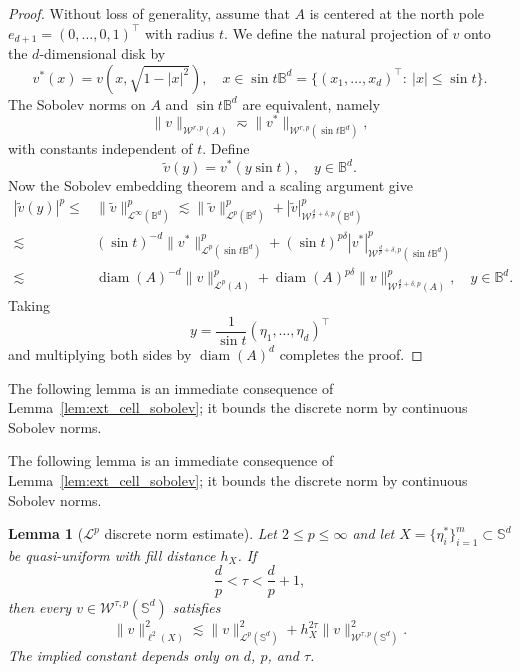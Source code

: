 \documentclass{article}
\numberwithin{equation}{section}
\newtheorem{lemma}{Lemma}
\def\BB{\mathbb{B}}
\def\SS{\mathbb{S}}
\begin{document}
\begin{proof}
    Without loss of generality, assume that $A$ is centered at the north pole $e_{d+1}=(0,\dots,0,1)^\top$ with radius $t$. We define the natural projection of $v$ onto the $d$-dimensional disk by
    \begin{equation*}
        v^*(x)=v(x,\sqrt{1-|x|^2}),\quad x\in\sin t\BB^d=\{(x_1,\dots,x_d)^\top:~|x|\leq\sin t\}.
    \end{equation*}
    The Sobolev norms on $A$ and $\sin t\BB^d$ are equivalent, namely
    \begin{equation}\label{eqn_equiv_cap_ball}
        \|v\|_{\mathcal{W}^{r,p}(A)}\eqsim\|v^*\|_{\mathcal{W}^{r,p}(\sin t\BB^d)},
    \end{equation}
    with constants independent of $t$. Define
    $$\tilde{v}(y)=v^*(y\sin t),\quad y\in\BB^d.$$
    Now the Sobolev embedding theorem and a scaling argument give
    \begin{equation*}
        \begin{split}
            |\tilde v(y)|^p
            \leq&\|\tilde v\|_{\mathcal{L}^{\infty}(\BB^d)}^p
            \lesssim\|\tilde v\|_{\mathcal{L}^p(\BB^d)}^p
            +|\tilde v|_{\mathcal{W}^{\frac dp+\delta,p}(\BB^d)}^p\\
            \lesssim&(\sin t)^{-d}\|v^*\|_{\mathcal{L}^p(\sin t\BB^d)}^p
            +(\sin t)^{p\delta}|v^*|_{\mathcal{W}^{\frac dp+\delta,p}(\sin t\BB^d)}^p\\
            \lesssim&\operatorname{diam}(A)^{-d}\|v\|_{\mathcal{L}^p(A)}^p
            +\operatorname{diam}(A)^{p\delta}\|v\|_{\mathcal W^{\frac dp+\delta,p}(A)}^p,\quad y\in\BB^d.
        \end{split}
    \end{equation*}
    Taking
    $$y=\frac{1}{\sin t}(\eta_1,\dots,\eta_d)^\top$$
    and multiplying both sides by $\operatorname{diam}(A)^d$ completes the proof.
\end{proof}

The following lemma is an immediate consequence of Lemma~\ref{lem:ext_cell_sobolev}; it bounds the discrete norm by continuous Sobolev norms.


The following lemma is an immediate consequence of Lemma~\ref{lem:ext_cell_sobolev}; it bounds the discrete norm by continuous Sobolev norms.

\begin{lemma}[$\mathcal L^p$ discrete norm estimate]\label{lem_discrete_by_cont}
Let $2\leq p\leq\infty$ and let $X=\{\eta_i^*\}_{i=1}^m\subset\SS^d$ be quasi-uniform with fill distance $h_X$. If
\begin{equation*}
    \frac dp<\tau<\frac dp+1,
\end{equation*}
then every $v\in\mathcal W^{\tau,p}(\SS^d)$ satisfies
\begin{equation}\label{eqn:norming}
    \|v\|_{\ell^2(X)}^2\lesssim\|v\|_{\mathcal L^p(\SS^d)}^2+h_X^{2\tau}\|v\|_{\mathcal W^{\tau,p}(\SS^d)}^2.
\end{equation}
The implied constant depends only on $d$, $p$, and $\tau$.
\end{lemma}
\end{document}
